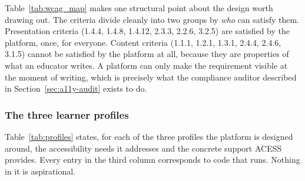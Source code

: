 \documentclass[12pt, oneside]{article} %
\begin{document}
Table~\ref{tab:wcag_map} makes one structural point about the design worth drawing out. The criteria divide cleanly into two groups by \emph{who} can satisfy them. Presentation criteria (1.4.4, 1.4.8, 1.4.12, 2.3.3, 2.2.6, 3.2.5) are satisfied by the platform, once, for everyone. Content criteria (1.1.1, 1.2.1, 1.3.1, 2.4.4, 2.4.6, 3.1.5) cannot be satisfied by the platform at all, because they are properties of what an educator writes. A platform can only make the requirement visible at the moment of writing, which is precisely what the compliance auditor described in Section~\ref{sec:a11y-audit} exists to do.

\subsubsection{The three learner profiles}

Table~\ref{tab:profiles} states, for each of the three profiles the platform is designed around, the accessibility needs it addresses and the concrete support ACESS provides. Every entry in the third column corresponds to code that runs. Nothing in it is aspirational.
\end{document}
